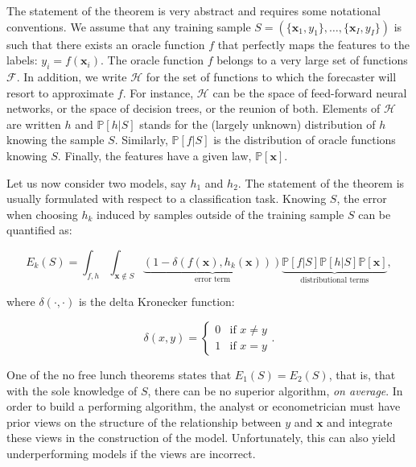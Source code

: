 The statement of the theorem is very abstract and requires some notational conventions. We assume that any training sample $S=(\{\textbf{x}_1,y_1\}, \dots, \{\textbf{x}_I,y_I\})$ is such that there exists an oracle function $f$ that perfectly maps the features to the labels: $y_i=f(\textbf{x}_i)$. The oracle function $f$ belongs to a very large set of functions $\mathcal{F}$. In addition, we write $\mathcal{H}$ for the set of functions to which the forecaster will resort to approximate $f$. For instance, $\mathcal{H}$ can be the space of feed-forward neural networks, or the space of decision trees, or the reunion of both. Elements of $\mathcal{H}$ are written $h$ and $\mathbb{P}[h|S]$ stands for the (largely unknown) distribution of $h$ knowing the sample $S$. Similarly, $\mathbb{P}[f|S]$ is the distribution of oracle functions knowing $S$. Finally, the features have a given law, $\mathbb{P}[\textbf{x}]$.

Let us now consider two models, say $h_1$ and $h_2$. The statement of the theorem is usually formulated with respect to a classification task. Knowing $S$, the error when choosing $h_k$ induced by samples outside of the training sample $S$ can be quantified as:

\begin{equation}
\label{eq:nolunch}
E_k(S)= \int_{f,h}\int_{\textbf{x}\notin S} \underbrace{ (1-\delta(f(\textbf{x}),h_k(\textbf{x})))}_{\text{error term}} \underbrace{\mathbb{P}[f|S]\mathbb{P}[h|S]\mathbb{P}[\textbf{x}]}_{\text{distributional terms}},
\end{equation}

where $\delta(\cdot,\cdot)$ is the delta Kronecker function:

\begin{equation}
\label{eq:deltak}
\delta(x,y)=\left\{\begin{array}{ll} 0 & \text{if } x\neq y \\ 1 & \text{if } x = y \end{array} .\right.
\end{equation}

One of the no free lunch theorems states that $E_1(S)=E_2(S)$, that is, that with the sole knowledge of $S$, there can be no superior algorithm, \textit{on average}. In order to build a performing algorithm, the analyst or econometrician must have prior views on the structure of the relationship between $y$ and $\textbf{x}$ and integrate these views in the construction of the model. Unfortunately, this can also yield underperforming models if the views are incorrect.

